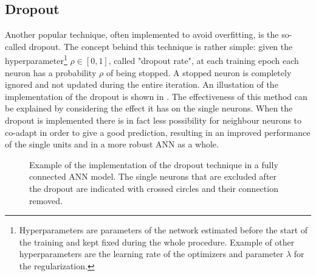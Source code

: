 \subsection{Dropout}\label{dropout}

Another popular technique, often implemented to avoid overfitting, is the so-called dropout\cite{srivastava}. The concept behind this technique is rather simple: given the hyperparameter\footnote{Hyperparameters are parameters of the network estimated before the start of the training and kept fixed during the whole procedure. Example of other hyperparameters are the learning rate of the optimizers and parameter $\lambda$ for the regularization.} $\rho\in [0,1]$, called "dropout rate", at each training epoch each neuron has a probability $\rho$ of being stopped. A stopped neuron is completely ignored and not updated during the entire iteration.
An illustation of the implementation of the dropout is shown in . The effectiveness of this method can be explained by considering the effect it has on the single neurons. When the dropout is implemented there is in fact less possibility for neighbour neurons to co-adapt in order to give a good prediction, resulting in an improved performance of the single units and in a more robust ANN as a whole.

\bigskip
\begin{figure}[h]
    \centering

\caption{Example of the implementation of the dropout technique in a fully connected ANN model. The single neurons that are excluded after the dropout are indicated with crossed circles and their connection removed. }
    \label{fig:dropout}
\end{figure}




